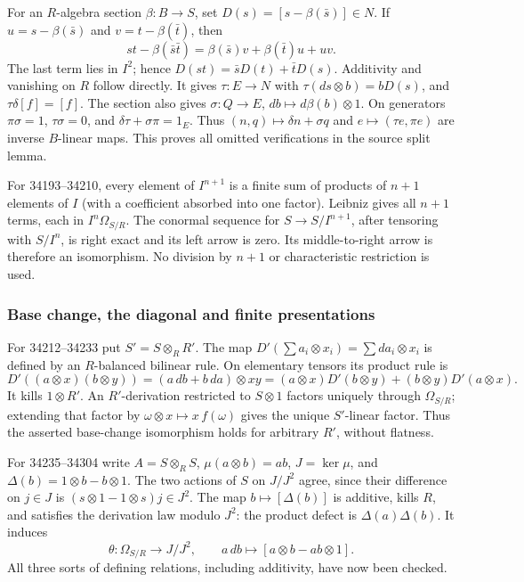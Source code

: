 For an \(R\)-algebra section \(\beta:B\to S\), set \(D(s)=[s-\beta(\bar s)]\in N\). If \(u=s-\beta(\bar s)\) and \(v=t-\beta(\bar t)\), then \[
st-\beta(\bar s\bar t)=\beta(\bar s)v+\beta(\bar t)u+uv.
\] The last term lies in \(I^2\); hence \(D(st)=\bar sD(t)+\bar tD(s)\). Additivity and vanishing on \(R\) follow directly. It gives \(\tau:E\to N\) with \(\tau(ds\otimes b)=bD(s)\), and \(\tau\delta[f]=[f]\). The section also gives \(\sigma:Q\to E\), \(db\mapsto d\beta(b)\otimes1\). On generators \(\pi\sigma=1\), \(\tau\sigma=0\), and \(\delta\tau+\sigma\pi=1_E\). Thus \((n,q)\mapsto\delta n+\sigma q\) and \(e\mapsto(\tau e,\pi e)\) are inverse \(B\)-linear maps. This proves all omitted verifications in the source split lemma.

For 34193--34210, every element of \(I^{n+1}\) is a finite sum of products of \(n+1\) elements of \(I\) (with a coefficient absorbed into one factor). Leibniz gives all \(n+1\) terms, each in \(I^n\Omega_{S/R}\). The conormal sequence for \(S\to S/I^{n+1}\), after tensoring with \(S/I^n\), is right exact and its left arrow is zero. Its middle-to-right arrow is therefore an isomorphism. No division by \(n+1\) or characteristic restriction is used.

\subsubsection{Base change, the diagonal and finite presentations}\label{algebra-proof-041-base-change-the-diagonal-and-finite-presentations}

For 34212--34233 put \(S'=S\otimes_R R'\). The map \(D'(\sum a_i\otimes x_i)=\sum da_i\otimes x_i\) is defined by an \(R\)-balanced bilinear rule. On elementary tensors its product rule is \[
D'((a\otimes x)(b\otimes y))=(a\,db+b\,da)\otimes xy
=(a\otimes x)D'(b\otimes y)+(b\otimes y)D'(a\otimes x).
\] It kills \(1\otimes R'\). An \(R'\)-derivation restricted to \(S\otimes1\) factors uniquely through \(\Omega_{S/R}\); extending that factor by \(\omega\otimes x\mapsto x\,f(\omega)\) gives the unique \(S'\)-linear factor. Thus the asserted base-change isomorphism holds for arbitrary \(R'\), without flatness.

For 34235--34304 write \(A=S\otimes_R S\), \(\mu(a\otimes b)=ab\), \(J=\ker\mu\), and \(\Delta(b)=1\otimes b-b\otimes1\). The two actions of \(S\) on \(J/J^2\) agree, since their difference on \(j\in J\) is \((s\otimes1-1\otimes s)j\in J^2\). The map \(b\mapsto[\Delta(b)]\) is additive, kills \(R\), and satisfies the derivation law modulo \(J^2\): the product defect is \(\Delta(a)\Delta(b)\). It induces \[
\theta:\Omega_{S/R}\longrightarrow J/J^2,\qquad a\,db\longmapsto[a\otimes b-ab\otimes1].
\] All three sorts of defining relations, including additivity, have now been checked.

